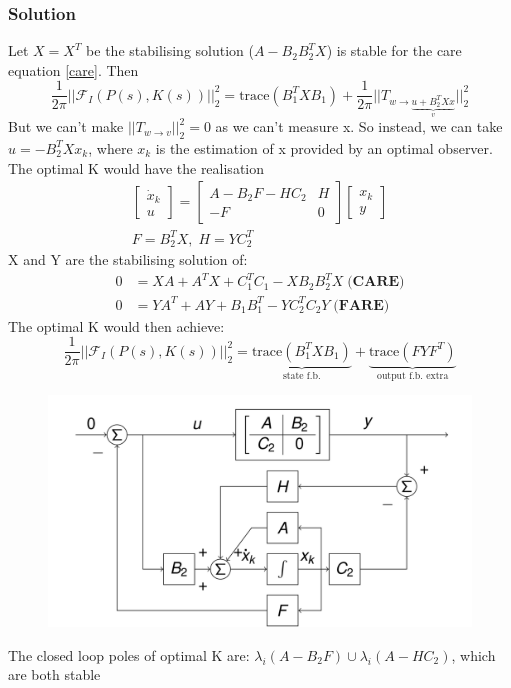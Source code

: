 \documentclass{article}
\begin{document}
\subsubsection*{Solution}
Let $X = X^T$ be the stabilising solution ($A-B_2B_2^TX$) is stable for the care equation \eqref{care}. Then
\[
\frac{1}{2 \pi} ||\mathcal{F}_I(P(s),K(s))||_2^2 = \text{trace}(B_1^TXB_1) + \frac{1}{2 \pi}|| T_{w \rightarrow \underbrace{u + B_2^TXx}_{v}}||_2^2
\]
But we can't make $||T_{w \rightarrow v}||_2^2 = 0$ as we can't measure x. So instead, we can take $u = -B_2^T X x_k$, where $x_k$ is the estimation of x provided by an optimal observer. The optimal K would have the realisation
\[
\begin{aligned}
\begin{bmatrix}
    \dot x_k \\ u
\end{bmatrix}
= 
\begin{bmatrix}
    A-B_2F - HC_2 & H \\ -F & 0
\end{bmatrix}
\begin{bmatrix}
    x_k \\ y
\end{bmatrix} \\ 
F = B_2^TX, \; H = YC_2^T
\end{aligned}
\]
X and Y are the stabilising solution of:
\[
\begin{aligned}
    0 &= XA + A^T X + C_1^TC_1 - XB_2B_2^TX \; \textbf{(CARE)} \\
    0 &= YA^T + AY + B_1B_1^T - YC_2^TC_2Y \; \textbf{(FARE)}
\end{aligned}
\]
The optimal K would then achieve:
\[
\frac{1}{2 \pi} ||\mathcal{F}_I(P(s),K(s))||_2^2 =
\underbrace{\text{trace}(B_1^TXB_1)}_{\text{state f.b.}} + \underbrace{\text{trace}(FYF^T)}_{\text{output f.b. extra}} 
\]
\begin{figure}[H]
    \centering
    \includegraphics[width=0.6\linewidth]{Screenshot 2023-02-02 at 12.35.53.png}
\end{figure}
The closed loop poles of optimal K are: $\lambda_i(A-B_2F) \cup \lambda_i(A-HC_2)$, which are both stable
\end{document}

